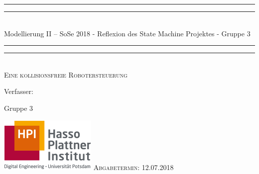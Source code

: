 \documentclass[11pt]{article}
\newlength{\drop}
\begin{document}
  \begin{titlepage}
    \textheight
    \centering
    \vspace*{\baselineskip}
    \rule{\textwidth}{1.6pt}\vspace*{-\baselineskip}\vspace*{2pt}
    \rule{\textwidth}{0.4pt}\\[\baselineskip]
    {\LARGE Modellierung II – SoSe 2018 - Reflexion des State Machine Projektes - Gruppe 3}\\[0.2\baselineskip]
    \rule{\textwidth}{0.4pt}\vspace*{-\baselineskip}\vspace{3.2pt}
    \rule{\textwidth}{1.6pt}\\[\baselineskip]
    \scshape
    Eine kollisionsfreie Robotersteuerung\par
    \vspace*{2\baselineskip}
    Verfasser: \\[\baselineskip]
    {\Large Gruppe 3\par}
    \centering
    \vspace{1cm}
    \includegraphics[width=0.25 \textwidth]{hpi.png}
    \vfill
    {\scshape Abgabetermin: 12.07.2018\\}
  \end{titlepage}
\end{document}
